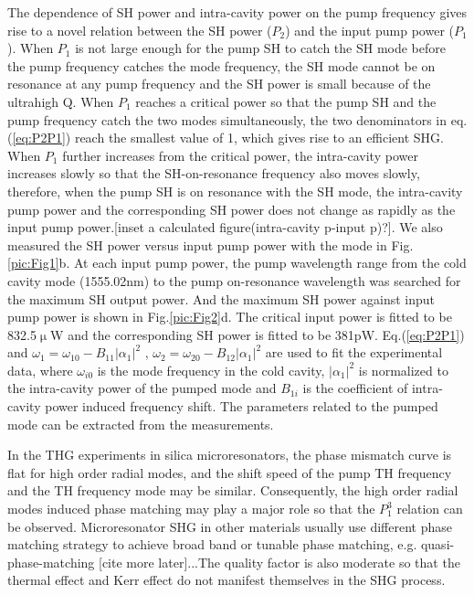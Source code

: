 \documentclass[a4paper,8pt,hyperref, twocolumn]{article}
\begin{document}
The dependence of SH power and intra-cavity power on the pump frequency gives rise to a novel relation between the SH power ($P_2$) and the input pump power ($P_1$). When $P_1$ is not large enough for the pump SH to catch the SH mode before the pump frequency catches the mode frequency, the SH mode cannot be on resonance at any pump frequency and the SH power is small because of the ultrahigh Q. When $P_1$ reaches a critical power so that the pump SH and the pump frequency catch the two modes simultaneously, the two denominators in eq.(\ref{eq:P2P1}) reach the smallest value of 1, which gives rise to an efficient SHG. When $P_1$ further increases from the critical power, the intra-cavity power increases slowly so that the SH-on-resonance frequency also moves slowly, therefore, when the pump SH is on resonance with the SH mode, the intra-cavity pump power and the corresponding SH power does not change as rapidly as the input pump power.[inset a calculated figure(intra-cavity p-input p)?]. We also measured the SH power versus input pump power with the mode in Fig.\ref{pic:Fig1}b. At each input pump power, the pump wavelength range from the cold cavity mode (1555.02nm) to the pump on-resonance wavelength was searched for the maximum SH output power. And the maximum SH power against input pump power is shown in Fig.\ref{pic:Fig2}d. The critical input power is fitted to be 832.5$\upmu$W and the corresponding SH power is fitted to be 381pW. Eq.(\ref{eq:P2P1}) and $\omega_1 = \omega_{10}-B_{11}|\alpha_1|^2$ \cite{carmon2004dynamical}, $\omega_2 = \omega_{20}-B_{12}|\alpha_1|^2$ are used to fit the experimental data, where $\omega_{i0}$ is the mode frequency in the cold cavity, $|\alpha_1|^2$ is normalized to the intra-cavity power of the pumped mode and $B_{1i}$ is the coefficient of intra-cavity power induced frequency shift. The parameters related to the pumped mode can be extracted from the measurements. 

In the THG experiments in silica microresonators\cite{carmon2007visible, farnesi2014optical}, the phase mismatch curve is flat for high order radial modes, and the shift speed of the pump TH frequency and the TH frequency mode may be similar. Consequently, the high order radial modes induced phase matching may play a major role so that the $P_1^3$ relation can be observed. Microresonator SHG in other materials usually use different phase matching strategy to achieve broad band or tunable phase matching, e.g. quasi-phase-matching [cite more later]...The quality factor is also moderate so that the thermal effect and Kerr effect do not manifest themselves in the SHG process.
\end{document}
